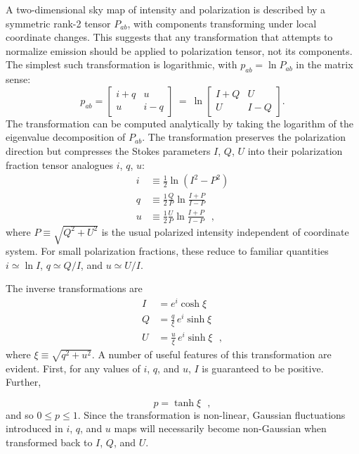\documentclass[twocolumn]{aastex631}
\begin{document}
A two-dimensional sky map of intensity and polarization is described by a symmetric rank-2 tensor $P_{ab}$, with components transforming under local coordinate changes. This suggests that any transformation that attempts to normalize emission should be applied to polarization tensor, not its components. The simplest such transformation is logarithmic, with $p_{ab} = \ln P_{ab}$ in the matrix sense:
\begin{equation}\label{eq:logP}
p_{ab} = \left[ \begin{matrix} i+q & u \\ u & i-q \end{matrix} \right] \ = \ 
    \ln \left[ \begin{matrix} I+Q & U \\ U & I-Q \end{matrix} \right].
\end{equation}
The transformation can be computed analytically by taking the logarithm of the eigenvalue decomposition of $P_{ab}$. The transformation preserves the polarization direction but compresses the Stokes parameters $I$, $Q$, $U$ into their polarization fraction tensor analogues $i$, $q$, $u$:
\begin{align}\label{eq:real2pt}
    i &\equiv \frac{1}{2} \ln (I^2 - P^2)\nonumber  \\
    q &\equiv  \frac{1}{2}\frac{Q}{P} \ln \frac{I+P}{I-P} \\
    u &\equiv  \frac{1}{2}\frac{U}{P} \ln \frac{I+P}{I-P}\nonumber 
    ~~~,
\end{align}
where $P \equiv \sqrt{Q^2 + U^2}$ is the usual polarized intensity independent of coordinate system. For small polarization fractions, these reduce to familiar quantities $i\simeq\ln I$, $q\simeq Q/I$, and $u\simeq U/I$. 

The inverse transformations are
\begin{align}\label{eq:pt2real}
    I &= e^i \cosh \xi \nonumber \\
    Q &= \frac{q}{\xi}\,e^i\sinh \xi  \\
    U &= \frac{u}{\xi}\,e^i\sinh \xi \nonumber
    ~~~,
\end{align}
where $\xi \equiv \sqrt{q^2 + u^2}$. A number of useful features of this transformation are evident. First, for any values of $i$, $q$, and $u$,  $I$ is guaranteed to be positive. Further,

\begin{equation}
    p = \tanh\xi
    ~~~,
\end{equation}
and so $0 \leq p \leq 1$. Since the transformation is non-linear, Gaussian fluctuations introduced in $i$, $q$, and $u$ maps will necessarily become non-Gaussian when transformed back to $I$, $Q$, and $U$.
\end{document}
